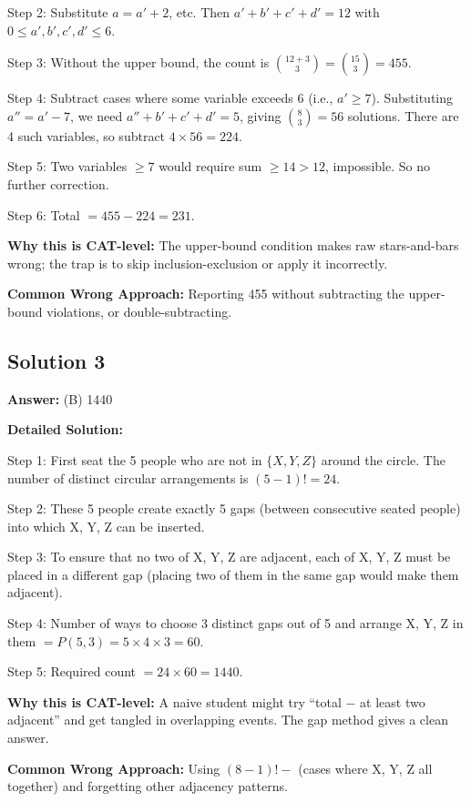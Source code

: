 \documentclass[11pt]{article}
\begin{document}
Step 2: Substitute \( a = a' + 2 \), etc. Then \( a' + b' + c' + d' = 12 \) with \( 0 \le a', b', c', d' \le 6 \).

Step 3: Without the upper bound, the count is \( \binom{12 + 3}{3} = \binom{15}{3} = 455 \).

Step 4: Subtract cases where some variable exceeds 6 (i.e., \( a' \ge 7 \)). Substituting \( a'' = a' - 7 \), we need \( a'' + b' + c' + d' = 5 \), giving \( \binom{8}{3} = 56 \) solutions. There are 4 such variables, so subtract \( 4 \times 56 = 224 \).

Step 5: Two variables \( \ge 7 \) would require sum \( \ge 14 > 12 \), impossible. So no further correction.

Step 6: Total \( = 455 - 224 = 231 \).

\textbf{Why this is CAT-level:} The upper-bound condition makes raw stars-and-bars wrong; the trap is to skip inclusion-exclusion or apply it incorrectly.

\textbf{Common Wrong Approach:} Reporting 455 without subtracting the upper-bound violations, or double-subtracting.

\subsection*{Solution 3}
\textbf{Answer:} (B) 1440

\textbf{Detailed Solution:}

Step 1: First seat the 5 people who are not in \( \{X, Y, Z\} \) around the circle. The number of distinct circular arrangements is \( (5-1)! = 24 \).

Step 2: These 5 people create exactly 5 gaps (between consecutive seated people) into which X, Y, Z can be inserted.

Step 3: To ensure that no two of X, Y, Z are adjacent, each of X, Y, Z must be placed in a different gap (placing two of them in the same gap would make them adjacent).

Step 4: Number of ways to choose 3 distinct gaps out of 5 and arrange X, Y, Z in them \( = P(5,3) = 5 \times 4 \times 3 = 60 \).

Step 5: Required count \( = 24 \times 60 = 1440 \).

\textbf{Why this is CAT-level:} A naive student might try ``total \( - \) at least two adjacent'' and get tangled in overlapping events. The gap method gives a clean answer.

\textbf{Common Wrong Approach:} Using \( (8-1)! - \) (cases where X, Y, Z all together) and forgetting other adjacency patterns.
\end{document}
